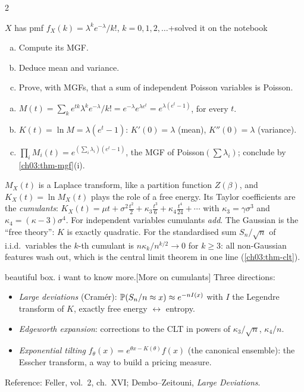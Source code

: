 \begin{paracol}{2}
\begin{exercise}\label{ch03:ex-poisson}
$X$ has pmf $f_X(k)=\lambda^ke^{-\lambda}/k!$, $k=0,1,2,\dots$\note+{solved it on the notebook}
\begin{enumerate}[(a)]
  \item Compute its MGF.
  \item Deduce mean and variance.
  \item Prove, with MGFs, that a sum of independent Poisson
      variables is Poisson.
\end{enumerate}
\end{exercise}
\begin{solution}[ch03:ex-poisson]
\begin{enumerate}[(a)]
  \item $M(t)=\sum_k e^{tk}\lambda^ke^{-\lambda}/k!=e^{-\lambda}e^{\lambda e^t}=e^{\lambda(e^t-1)}$, for every $t$.
  \item $K(t)=\ln M=\lambda(e^t-1)$: $K'(0)=\lambda$ (mean), $K''(0)=\lambda$ (variance).
  \item $\prod_iM_i(t)=e^{(\sum_i\lambda_i)(e^t-1)}$, the MGF of Poisson$(\sum\lambda_i)$; conclude by \cref{ch03:thm-mgf}(i).
\end{enumerate}
\end{solution}

\begin{intuition}
$M_X(t)$ is a Laplace transform, like a partition function $Z(\beta)$, and $K_X(t)=\ln M_X(t)$ plays the role of
a free energy. Its Taylor coefficients are the \emph{cumulants}: $K_X(t)=\mu t+\sigma^2\frac{t^2}{2}+\kappa_3\frac{t^3}{6}+
\kappa_4\frac{t^4}{24}+\cdots$ with $\kappa_3=\gamma\sigma^3$ and $\kappa_4=(\kappa-3)\sigma^4$. For independent variables
cumulants \emph{add}. The Gaussian is the ``free theory'': $K$ is exactly quadratic. For the standardised sum
$S_n/\sqrt n$ of i.i.d.\ variables the $k$-th cumulant is $n\kappa_k/n^{k/2}\to0$ for $k\ge3$: all non-Gaussian
features wash out, which is the central limit theorem in one line (\cref{ch03:thm-clt}).
\end{intuition}\begin{answer}{beautiful box. i want to know more.}[More on cumulants]
Three directions:
\begin{itemize}
  \item \emph{Large deviations} (Cram\'er): $\mathbb{P}(S_n/n\approx x)\approx e^{-nI(x)}$ with $I$ the Legendre
        transform of $K$, exactly free energy $\leftrightarrow$ entropy.
  \item \emph{Edgeworth expansion}: corrections to the CLT in powers of $\kappa_3/\sqrt n$, $\kappa_4/n$.
  \item \emph{Exponential tilting} $f_\theta(x)=e^{\theta x-K(\theta)}f(x)$ (the canonical ensemble): the Esscher
        transform, a way to build a pricing measure.
\end{itemize}
Reference: Feller, vol.~2, ch.~XVI; Dembo--Zeitouni, \emph{Large Deviations}.
\end{answer}


\end{paracol}
